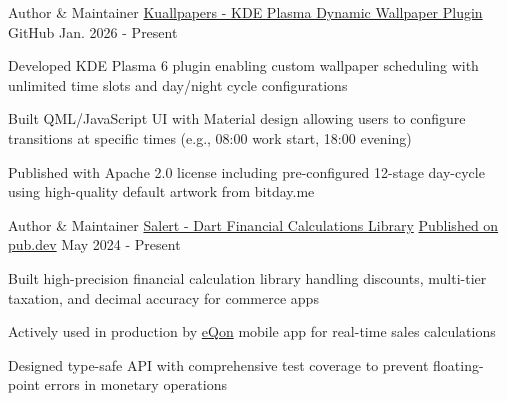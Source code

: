 
\begin{cventries}

  \cventry
    {Author \& Maintainer} %
    {\href{https://github.com/zp1ke/kuallpapers}{Kuallpapers - KDE Plasma Dynamic Wallpaper Plugin}} %
    {\faGithubSquare\acvHeaderIconSep GitHub} %
    {Jan. 2026 - Present} %
    {
      \begin{cvitems} %
        \item {Developed KDE Plasma 6 plugin enabling custom wallpaper scheduling with unlimited time slots and day/night cycle configurations}
        \item {Built QML/JavaScript UI with Material design allowing users to configure transitions at specific times (e.g., 08:00 work start, 18:00 evening)}
        \item {Published with Apache 2.0 license including pre-configured 12-stage day-cycle using high-quality default artwork from bitday.me}
      \end{cvitems}
    }

  \cventry
    {Author \& Maintainer} %
    {\href{https://github.com/zp1ke/salert}{Salert - Dart Financial Calculations Library}} %
    {\href{https://pub.dev/packages/salert}{Published on pub.dev}} %
    {May 2024 - Present} %
    {
      \begin{cvitems} %
        \item {Built high-precision financial calculation library handling discounts, multi-tier taxation, and decimal accuracy for commerce apps}
        \item {Actively used in production by {\href{https://eqon.ec/}{eQon}} mobile app for real-time sales calculations}
        \item {Designed type-safe API with comprehensive test coverage to prevent floating-point errors in monetary operations}
      \end{cvitems}
    }


\end{cventries}
